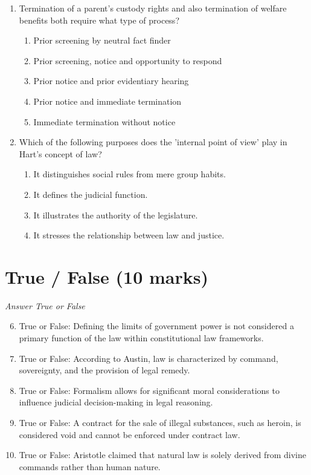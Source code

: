 \documentclass[12pt]{article}
\begin{document}
\begin{enumerate}[label=\arabic*.]
\begin{enumerate}[label=(\alph*)]
\end{enumerate}
\item Termination of a parent's custody rights and also termination of welfare benefits both require what type of process?
\begin{enumerate}[label=(\alph*)]
    \item Prior screening by neutral fact finder
    \item Prior screening, notice and opportunity to respond
    \item Prior notice and prior evidentiary hearing
    \item Prior notice and immediate termination
    \item Immediate termination without notice
\end{enumerate}
\item Which of the following purposes does the 'internal point of view' play in Hart's concept of law?
\begin{enumerate}[label=(\alph*)]
    \item It distinguishes social rules from mere group habits.
    \item It defines the judicial function.
    \item It illustrates the authority of the legislature.
    \item It stresses the relationship between law and justice.
\end{enumerate}
\end{enumerate}

\section*{True / False (10 marks)}
\textit{Answer True or False}
\begin{enumerate}[label=\arabic*.]
\setcounter{enumi}{5}
\item True or False: Defining the limits of government power is not considered a primary function of the law within constitutional law frameworks.
\item True or False: According to Austin, law is characterized by command, sovereignty, and the provision of legal remedy.
\item True or False: Formalism allows for significant moral considerations to influence judicial decision-making in legal reasoning.
\item True or False: A contract for the sale of illegal substances, such as heroin, is considered void and cannot be enforced under contract law.
\item True or False: Aristotle claimed that natural law is solely derived from divine commands rather than human nature.
\end{enumerate}
\end{document}
